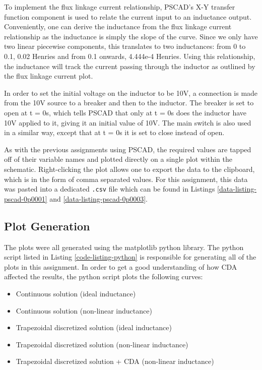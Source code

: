 \documentclass[10pt, oneside, letterpaper]{article}
\begin{document}
To implement the flux linkage current relationship, PSCAD's X-Y transfer function component is used to relate the current input to an inductance output. Conveniently, one can derive the inductance from the flux linkage current relationship as the inductance is simply the slope of the curve. Since we only have two linear piecewise components, this translates to two inductances: from 0 to 0.1, 0.02 Henries and from 0.1 onwards, 4.444e-4 Henries. Using this relationship, the inductance will track the current passing through the inductor as outlined by the flux linkage current plot.

In order to set the initial voltage on the inductor to be 10V, a connection is made from the 10V source to a breaker and then to the inductor. The breaker is set to open at t = 0s, which tells PSCAD that only at t = 0s does the inductor have 10V applied to it, giving it an initial value of 10V. The main switch is also used in a similar way, except that at t = 0s it is set to close instead of open.

As with the previous assignments using PSCAD, the required values are tapped off of their variable names and plotted directly on a single plot within the schematic. Right-clicking the plot allows one to export the data to the clipboard, which is in the form of comma separated values. For this assignment, this data was pasted into a dedicated \texttt{.csv} file which can be found in Listings \ref{data-listing-pscad-0p0001} and \ref{data-listing-pscad-0p0003}.

\subsection{Plot Generation}

The plots were all generated using the matplotlib python library. The python script listed in Listing \ref{code-listing-python} is responsible for generating all of the plots in this assignment. In order to get a good understanding of how CDA affected the results, the python script plots the following curves:

\begin{itemize}
    \item Continuous solution (ideal inductance)
    \item Continuous solution (non-linear inductance)
    \item Trapezoidal discretized solution (ideal inductance)
    \item Trapezoidal discretized solution (non-linear inductance)
    \item Trapezoidal discretized solution + CDA (non-linear inductance)
\end{itemize}
\end{document}
